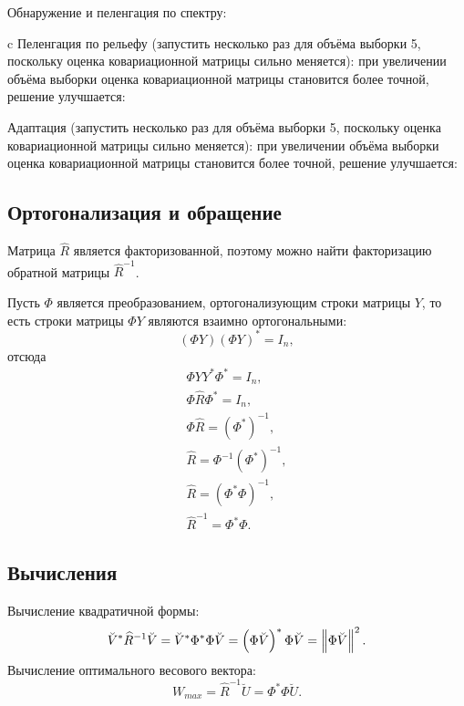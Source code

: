 Обнаружение и пеленгация по спектру:
\begin{Matlab}
\end{Matlab}
c
Пеленгация по рельефу (запустить несколько раз для объёма выборки 5, поскольку оценка ковариационной матрицы сильно меняется):
\noindent при увеличении объёма выборки оценка ковариационной матрицы становится более точной, решение улучшается:

Адаптация (запустить несколько раз для объёма выборки 5, поскольку оценка ковариационной матрицы сильно меняется):
\noindent при увеличении объёма выборки оценка ковариационной матрицы становится более точной, решение улучшается:

\subsection{Ортогонализация и обращение}

Матрица $\widehat{R}$ является факторизованной, поэтому можно найти факторизацию обратной матрицы $\widehat{R}^{-1}$.

Пусть $\Phi$ является преобразованием, ортогонализующим строки матрицы $Y$, то есть строки матрицы $\Phi Y$ являются взаимно ортогональными:
\[
    \left( \Phi Y \right) \left( \Phi Y \right)^* = I_n ,
\]
отсюда
\begin{gather*}
    \Phi Y Y^* \Phi^* = I_n , \\
    \Phi \widehat{R} \Phi^* = I_n , \\
    \Phi \widehat{R} = \left(\Phi^* \right)^{-1}, \\
    \widehat{R} = \Phi^{-1} \left(\Phi^* \right)^{-1}, \\
    \widehat{R} = \left(\Phi^* \Phi \right)^{-1}, \\
    \widehat{R}^{-1} = \Phi^* \Phi .
\end{gather*}

\subsection{Вычисления}

Вычисление квадратичной формы:
\[
    \breve{V}^* \widehat{R}^{-1} \breve{V}
    = \breve{V}^* \Phi^* \Phi \breve{V}
    = \left( \Phi \breve{V} \right)^* \Phi \breve{V}
    = \left \| \Phi \breve{V} \right \|^2 .
\]
Вычисление оптимального весового вектора:
\[
    W_{max}
    = \widehat{R}^{-1} \breve{U}
    = \Phi^* \Phi \breve{U} .
\]